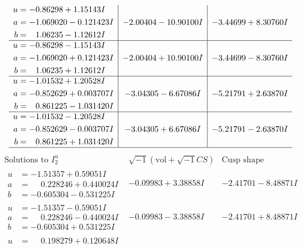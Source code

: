 \documentclass[1p]{elsarticle_modified}
\theoremstyle{definition}
\newcommand{\I}{\sqrt{-1}}
\begin{document}
$$\begin{array}{c|c|c}
\begin{aligned}
u &= -0.86298 + 1.15143 I \\
a &= -1.069020 - 0.121423 I \\
b &= \phantom{-}1.06235 - 1.12612 I\end{aligned}
 & -2.00404 - 10.90100 I & -3.44699 + 8.30760 I \\ \hline\begin{aligned}
u &= -0.86298 - 1.15143 I \\
a &= -1.069020 + 0.121423 I \\
b &= \phantom{-}1.06235 + 1.12612 I\end{aligned}
 & -2.00404 + 10.90100 I & -3.44699 - 8.30760 I \\ \hline\begin{aligned}
u &= -1.01532 + 1.20528 I \\
a &= -0.852629 + 0.003707 I \\
b &= \phantom{-}0.861225 - 1.031420 I\end{aligned}
 & -3.04305 - 6.67086 I & -5.21791 + 2.63870 I \\ \hline\begin{aligned}
u &= -1.01532 - 1.20528 I \\
a &= -0.852629 - 0.003707 I \\
b &= \phantom{-}0.861225 + 1.031420 I\end{aligned}
 & -3.04305 + 6.67086 I & -5.21791 - 2.63870 I\\
 \hline 
 \end{array}$$\newpage$$\begin{array}{c|c|c}  
\text{Solutions to }I^u_{2}& \I (\text{vol} + \sqrt{-1}CS) & \text{Cusp shape}\\
 \hline 
\begin{aligned}
u &= -1.51357 + 0.59051 I \\
a &= \phantom{-}0.228246 + 0.440024 I \\
b &= -0.605304 - 0.531225 I\end{aligned}
 & -0.09983 + 3.38858 I & -2.41701 - 8.48871 I \\ \hline\begin{aligned}
u &= -1.51357 - 0.59051 I \\
a &= \phantom{-}0.228246 - 0.440024 I \\
b &= -0.605304 + 0.531225 I\end{aligned}
 & -0.09983 - 3.38858 I & -2.41701 + 8.48871 I \\ \hline\begin{aligned}
u &= \phantom{-}0.198279 + 0.120648 I \\

\end{aligned}
\end{array}$$
\end{document}
